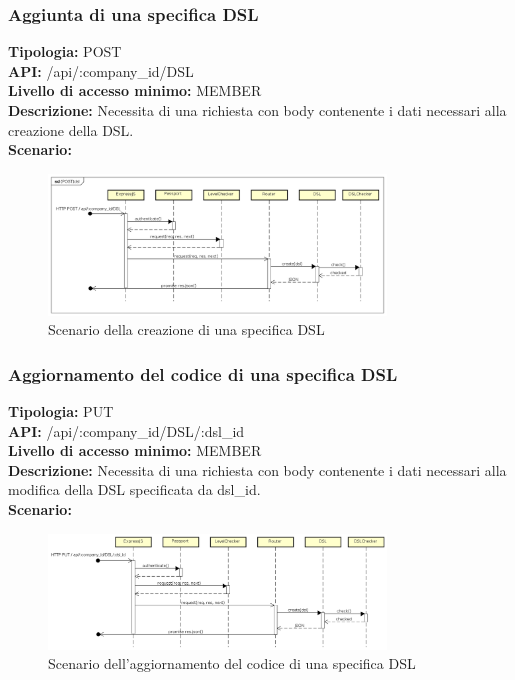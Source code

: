 \newpage
\subsubsection{Aggiunta di una specifica DSL}
\textbf{Tipologia:} POST \\
\textbf{API:} /api/:company\_id/DSL \\
\textbf{Livello di accesso minimo:} MEMBER \\
\textbf{Descrizione:} Necessita di una richiesta con body contenente i dati necessari alla creazione della DSL. \\
\textbf{Scenario:} 
\begin{figure}[h]
\centering
\includegraphics[width=0.8\textwidth]{res/sections/backend/(POST)dsl.png}
\caption{Scenario della creazione di una specifica DSL}
\end{figure}

\newpage
\subsubsection{Aggiornamento del codice di una specifica DSL}
\textbf{Tipologia:} PUT \\
\textbf{API:} /api/:company\_id/DSL/:dsl\_id \\
\textbf{Livello di accesso minimo:} MEMBER \\
\textbf{Descrizione:} Necessita di una richiesta con body contenente i dati necessari alla modifica della DSL specificata da dsl\_id. \\
\textbf{Scenario:}
\begin{figure}[h]
\centering
\includegraphics[width=0.8\textwidth]{res/sections/backend/(PUT)dsl.png}
\caption{Scenario dell'aggiornamento del codice di una specifica DSL}
\end{figure}

